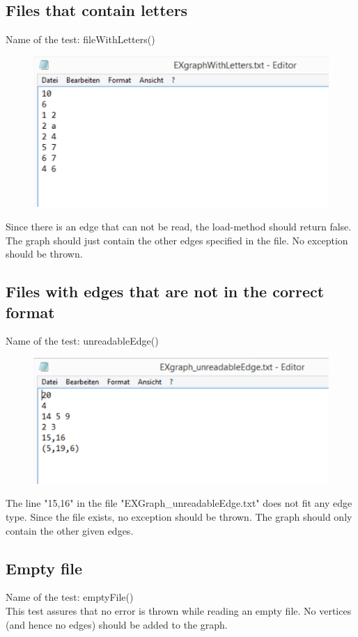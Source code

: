 \documentclass{article}
\begin{document}
\subsection{Files that contain letters}
Name of the test: fileWithLetters()
\begin{figure}[H]
	\includegraphics[width=.7\textwidth,keepaspectratio]{./img/letters.pdf}
\end{figure}
Since there is an edge that can not be read, the load-method should return false. The graph should just contain the other edges specified in the file. No exception should be thrown.
\subsection{Files with edges that are not in the correct format}
Name of the test: unreadableEdge()
\begin{figure}[H]
	\includegraphics[width=.7\textwidth,keepaspectratio]{./img/unreadableEdge.pdf}
\end{figure}
The line "15,16" in the file "EXGraph\_unreadableEdge.txt" does not fit any edge type. Since the file exists, no exception should be thrown. The graph should only contain the other given edges.
\subsection{Empty file}
Name of the test: emptyFile() \\
This test assures that no error is thrown while reading an empty file. No vertices (and hence no edges) should be added to the graph.
\end{document}
